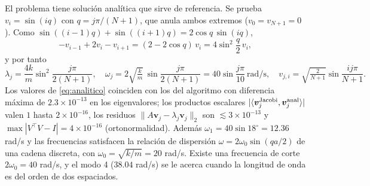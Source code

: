\documentclass[11pt,a4paper]{article}
\newcommand{\vect}[1]{\bm{#1}}
\begin{document}
\begin{table}[H]\centering\small
\resizebox{\textwidth}{!}{}
\caption{Eigenvalores y frecuencias naturales de la cadena de cuatro masas (Jacobi), comparados con la fórmula analítica.}\label{tab:modos}
\end{table}
\begin{table}[H]\centering\small

\caption{Eigenvectores normalizados del método de Jacobi ($v_{j,i}$: componente de la masa $i$ en el modo $j$).}\label{tab:vec}
\end{table}

El problema tiene solución analítica que sirve de referencia. Se prueba $v_i=\sin(iq)$ con $q=j\pi/(N+1)$, que anula ambos extremos ($v_0=v_{N+1}=0$). Como $\sin((i-1)q)+\sin((i+1)q)=2\cos q\,\sin(iq)$,
\[
-v_{i-1}+2v_i-v_{i+1}=(2-2\cos q)\,v_i=4\sin^2\!\frac q2\,v_i,
\]
y por tanto
\begin{equation}
\lambda_j=\frac{4k}{m}\sin^2\!\frac{j\pi}{2(N+1)},\quad \omega_j=2\sqrt{\tfrac km}\,\sin\frac{j\pi}{2(N+1)}=40\sin\frac{j\pi}{10}\ \mathrm{rad/s},\quad v_{j,i}=\sqrt{\tfrac2{N+1}}\sin\frac{ij\pi}{N+1}. \label{eq:analitico}
\end{equation}
Los valores de \eqref{eq:analitico} coinciden con los del algoritmo con diferencia máxima de $2.3\times10^{-13}$ en los eigenvalores; los productos escalares $|\langle\vect v_j^{\rm Jacobi},\vect v_j^{\rm anal}\rangle|$ valen $1$ hasta $2\times10^{-16}$, los residuos $\|A\vect v_j-\lambda_j\vect v_j\|_2$ son $\lesssim3\times10^{-13}$ y $\max|V^\top V-I|=4\times10^{-16}$ (ortonormalidad). Además $\omega_1=40\sin18^\circ=12.36$ rad/s y las frecuencias satisfacen la relación de dispersión $\omega=2\omega_0\sin(qa/2)$ de una cadena discreta, con $\omega_0=\sqrt{k/m}=20$ rad/s. Existe una frecuencia de corte $2\omega_0=40$ rad/s, y el modo 4 ($38.04$ rad/s) se le acerca cuando la longitud de onda es del orden de dos espaciados.
\end{document}
